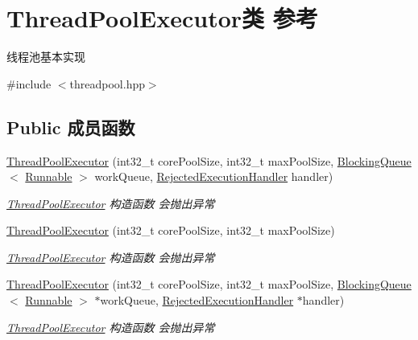\hypertarget{classThreadPoolExecutor}{}\section{Thread\+Pool\+Executor类 参考}
\label{classThreadPoolExecutor}


线程池基本实现  




{\ttfamily \#include $<$threadpool.\+hpp$>$}

\subsection*{Public 成员函数}
\begin{DoxyCompactItemize}
\item 
\hyperlink{classThreadPoolExecutor_adc2bbcf28a95be1ba7fea937f6ba7998}{Thread\+Pool\+Executor} (int32\+\_\+t core\+Pool\+Size, int32\+\_\+t max\+Pool\+Size, \hyperlink{classBlockingQueue}{Blocking\+Queue}$<$ \hyperlink{classRunnable}{Runnable} $>$ work\+Queue, \hyperlink{classRejectedExecutionHandler}{Rejected\+Execution\+Handler} handler)
\begin{DoxyCompactList}\small\item\em \hyperlink{classThreadPoolExecutor}{Thread\+Pool\+Executor} 构造函数 会抛出异常 \end{DoxyCompactList}\item 
\hyperlink{classThreadPoolExecutor_a226b8d6d38ce601e27974eb2e8b1dbb9}{Thread\+Pool\+Executor} (int32\+\_\+t core\+Pool\+Size, int32\+\_\+t max\+Pool\+Size)
\begin{DoxyCompactList}\small\item\em \hyperlink{classThreadPoolExecutor}{Thread\+Pool\+Executor} 构造函数 会抛出异常 \end{DoxyCompactList}\item 
\hyperlink{classThreadPoolExecutor_ace4ccc92f13fdeed49fb5e6efb7ee233}{Thread\+Pool\+Executor} (int32\+\_\+t core\+Pool\+Size, int32\+\_\+t max\+Pool\+Size, \hyperlink{classBlockingQueue}{Blocking\+Queue}$<$ \hyperlink{classRunnable}{Runnable} $>$ $\ast$work\+Queue, \hyperlink{classRejectedExecutionHandler}{Rejected\+Execution\+Handler} $\ast$handler)
\begin{DoxyCompactList}\small\item\em \hyperlink{classThreadPoolExecutor}{Thread\+Pool\+Executor} 构造函数 会抛出异常 \end{DoxyCompactList}\item 

\end{DoxyCompactItemize}
